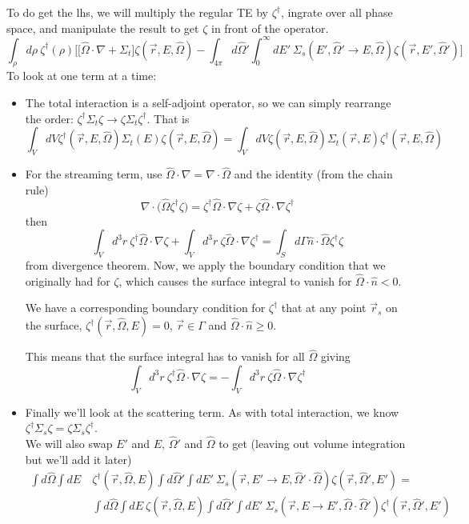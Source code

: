 \documentclass[12pt]{article}
\newcommand{\rvec}{\ensuremath{\vec{r}}}
\newcommand{\vOmega}{\ensuremath{\hat{\Omega}}}
\begin{document}
To do get the lhs, we will multiply the regular TE by $\zeta^{\dagger}$, ingrate over all phase space, and manipulate the result to get $\zeta$ in front of the operator.
%
\[\int_{\rho} d\rho\: \zeta^{\dagger}(\rho)\biggl[ \bigl[\vOmega \cdot \nabla + \Sigma_t\bigr] \zeta(\vec{r}, E, \vOmega) - \int_{4 \pi} d\vOmega' \int_0^{\infty} dE' \: \Sigma_s(E', \vOmega' \rightarrow E, \vOmega) \zeta(\vec{r}, E', \vOmega') \biggr]\]
% 
To look at one term at a time:
\begin{itemize}
\item The total interaction is a self-adjoint operator, so we can simply rearrange the order: $\zeta^{\dagger} \Sigma_t \zeta \rightarrow \zeta \Sigma_t \zeta^{\dagger}$. That is
\[\int_V dV \zeta^{\dagger}(\vec{r}, E, \vOmega) \Sigma_t(E) \zeta(\vec{r}, E, \vOmega) = \int_V dV \zeta(\vec{r}, E, \vOmega) \Sigma_t(\rvec,E) \zeta^{\dagger}(\vec{r}, E, \vOmega)\]
%
\item For the streaming term, use $\vOmega \cdot \nabla = \nabla \cdot \vOmega$ and the identity (from the chain rule)
\[\nabla \cdot \bigl(\vOmega \zeta^{\dagger} \zeta \bigr) = \zeta^{\dagger}\vOmega \cdot \nabla \zeta + \zeta \vOmega \cdot \nabla \zeta^{\dagger}\]
then
\[
\int_V d^3r \:\zeta^{\dagger}\vOmega \cdot \nabla \zeta + \int_V d^3r \:\zeta \vOmega \cdot \nabla \zeta^{\dagger} = \int_S d \Gamma \hat{n} \cdot \vOmega \zeta^{\dagger} \zeta
\]
from divergence theorem. Now, we apply the boundary condition that we originally had for $\zeta$, which causes the surface integral to vanish for $\vOmega \cdot \hat{n} < 0$.

We have a corresponding boundary condition for $\zeta^{\dagger}$ that at any point $\rvec_s$ on the surface, $\zeta^{\dagger}(\rvec, \vOmega, E) = 0$, $\vec{r} \in \Gamma$ and $\vOmega \cdot \hat{n} \geq 0$.

This means that the surface integral has to vanish for all $\vOmega$ giving
\[
\int_V d^3r \:\zeta^{\dagger}\vOmega \cdot \nabla \zeta = -\int_V d^3r \:\zeta \vOmega \cdot \nabla \zeta^{\dagger}
\]
%
\item Finally we'll look at the scattering term. As with total interaction, we know $\zeta^{\dagger} \Sigma_s \zeta  = \zeta \Sigma_s \zeta^{\dagger}$. \\
We will also swap $E'$ and $E$, $\vOmega'$ and $\vOmega$ to get (leaving out volume integration but we'll add it later)
\begin{align*}
\int d\vOmega \int dE\: &\zeta^{\dagger}(\rvec, \vOmega, E) \int d\vOmega' \int dE'\: \Sigma_s(\rvec, E' \rightarrow E, \vOmega' \cdot \vOmega) \zeta(\rvec, \vOmega', E') = \\
%
&\int d\vOmega \int dE\: \zeta(\rvec, \vOmega, E) \int d\vOmega' \int dE'\: \Sigma_s(\rvec, E \rightarrow E', \vOmega \cdot \vOmega') \zeta^{\dagger}(\rvec, \vOmega', E') 
\end{align*}
\end{itemize}
\end{document}
